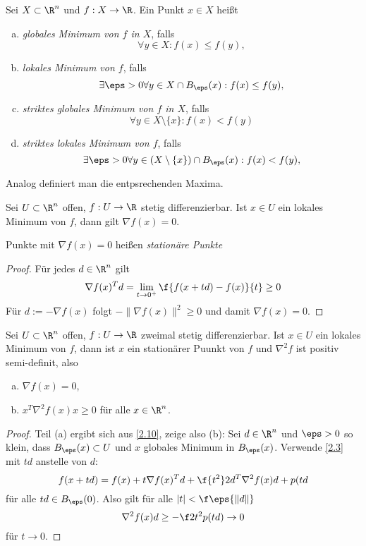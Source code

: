 \begin{df} \label{2.9}
	Sei $X \subset \R^n$ und $f: X \to \R$.
	Ein Punkt $x \in X$ heißt
	\begin{enumerate}[(a)]
		\item
			\emph{globales Minimum von $f$ in $X$}, falls
			\[
				\forall y \in X: f(x) \le f(y),
			\]
		\item
			\emph{lokales Minimum von $f$}, falls
			\[
				\exists \eps > 0 \forall y \in X \cap B_\eps(x): f(x) \le f(y),
			\]
		\item
			\emph{striktes globales Minimum von $f$ in $X$}, falls
			\[
				\forall y \in X \setminus \{x\}: f(x) < f(y)
			\]
		\item
			\emph{striktes lokales Minimum von $f$}, falls
			\[
				\exists \eps > 0 \forall y \in (X \setminus \{x\}) \cap B_\eps(x): f(x) < f(y),
			\]
	\end{enumerate}
	Analog definiert man die entpsrechenden Maxima.
\end{df}

\begin{st} \label{2.10}
	Sei $U \subset \R^n$ offen, $f: U \to \R$ stetig differenzierbar.
	Ist $x \in U$ ein lokales Minimum von $f$, dann gilt $\nabla f(x) = 0$.

	Punkte mit $\nabla f(x) = 0$ heißen \emph{stationäre Punkte}
	\begin{proof}
		Für jedes $d \in \R^n$ gilt
		\[
			\nabla f(x)^T d
			= \lim_{t \to 0^+} \f {f(x+td) - f(x)}{t}
			\ge 0
		\]
		Für $d := - \nabla f(x)$ folgt $-\|\nabla f(x)\|^2 \ge 0$ und damit $\nabla f(x) = 0$.
	\end{proof}
\end{st}

\begin{st} \label{2.11}
	Sei $U \subset \R^n$ offen, $f: U \to \R$ zweimal stetig differenzierbar.
	Ist $x \in U$ ein lokales Minimum von $f$, dann ist $x$ ein stationärer Puunkt von $f$ und $\nabla^2 f$ ist positiv semi-definit, also
	\begin{enumerate}[(a)]
		\item
			$\nabla f(x) = 0$,
		\item
			$x^T \nabla^2 f(x) x \ge 0$ für alle $x \in \R^n$.
	\end{enumerate}
	\begin{proof}
		Teil (a) ergibt sich aus \ref{2.10}, zeige also (b):
		Sei $d \in \R^n$ und $\eps > 0$ so klein, dass $B_\eps(x) \subset U$ und $x$ globales Minimum in $B_\eps(x)$.
		Verwende \ref{2.3} mit $td$ anstelle von $d$:
		\[
			f(x+td)
			= f(x) + t \nabla f(x)^T d + \f {t^2}2 d^T \nabla^2 f(x) d + p(td
		\]
		für alle $td \in B_\eps(0)$.
		Also gilt für alle $|t| < \f \eps{\|d\|}$
		\[
			\nabla^2 f(x) d
			\ge - \f 2{t^2} p(td)
			\to 0
		\]
		für $t \to 0$.
	\end{proof}
\end{st}

